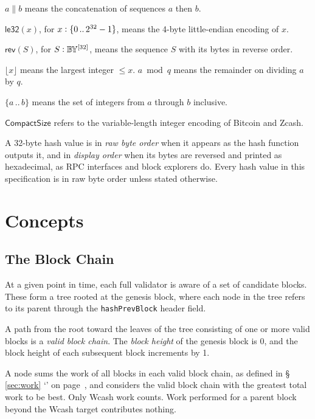\documentclass[10pt,letterpaper]{article}
\newcommand\term[1]{\textsl{#1}}
\newcommand\typ{\mathrel{\vcentcolon}}
\newcommand\BY{\mathbb{B}\kern-0.1em\mathbb{Y}}
\newcommand\fn[1]{\mathsf{#1}}
\newcommand\cat{\mathbin{\|}}
\newcommand\secref[1]{\S\,\ref{#1} `\nameref{#1}' on page~\pageref{#1}}
\theoremstyle{plain}
\begin{document}
$a \cat b$ means the concatenation of sequences $a$ then $b$.

$\fn{le32}(x)$, for $x \typ \{0\,..\,2^{32}-1\}$, means the 4-byte little-endian encoding of $x$.

$\fn{rev}(S)$, for $S \typ \BY^{[32]}$, means the sequence $S$ with its bytes in reverse order.

$\lfloor x \rfloor$ means the largest integer $\le x$. $a \bmod q$ means the remainder on dividing $a$ by $q$.

$\{a\,..\,b\}$ means the set of integers from $a$ through $b$ inclusive.

$\fn{CompactSize}$ refers to the variable-length integer encoding of Bitcoin and Zcash.

A 32-byte hash value is in \term{raw byte order} when it appears as the hash function outputs it, and in \term{display order} when its bytes are reversed and printed as hexadecimal, as RPC interfaces and block explorers do. Every hash value in this specification is in raw byte order unless stated otherwise.

\section{Concepts}\label{sec:concepts}

\subsection{The Block Chain}\label{sec:blockchain}

At a given point in time, each full validator is aware of a set of candidate blocks. These form a tree rooted at the genesis block, where each node in the tree refers to its parent through the \texttt{hashPrevBlock} header field.

A path from the root toward the leaves of the tree consisting of one or more valid blocks is a \term{valid block chain}. The \term{block height} of the genesis block is 0, and the block height of each subsequent block increments by 1.

A node sums the work of all blocks in each valid block chain, as defined in \secref{sec:work}, and considers the valid block chain with the greatest total work to be best. Only Wcash work counts. Work performed for a parent block beyond the Wcash target contributes nothing.
\end{document}
